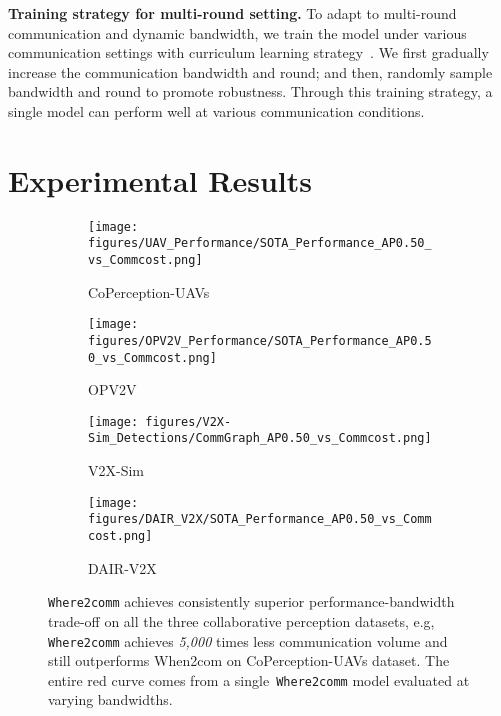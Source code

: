 \documentclass{article}
\begin{document}
\textbf{Training strategy for multi-round setting.} To adapt to multi-round communication and dynamic bandwidth, we train the model under various communication settings with curriculum learning strategy~\cite{curriculum}. We first gradually increase the communication bandwidth and round; and then, randomly sample bandwidth and round to promote robustness. Through this training strategy, a single model can perform well at various communication conditions.
%
 \vspace{-2mm}
\section{Experimental Results}
\vspace{-2mm}


\begin{figure}[!t]
  \centering
\begin{subfigure}{0.49\linewidth}
    \texttt{[image: figures/UAV\_Performance/SOTA\_Performance\_AP0.50\_vs\_Commcost.png]}
    \caption{CoPerception-UAVs}
    \label{fig:UAV_SOTA}
  \end{subfigure}
\begin{subfigure}{0.49\linewidth}
    \texttt{[image: figures/OPV2V\_Performance/SOTA\_Performance\_AP0.50\_vs\_Commcost.png]}
    \caption{OPV2V}
    \label{fig:OPV2V_SOTA}
  \end{subfigure}
\begin{subfigure}{0.49\linewidth}
    \texttt{[image: figures/V2X-Sim\_Detections/CommGraph\_AP0.50\_vs\_Commcost.png]}
    \caption{V2X-Sim}
    \label{fig:V2X_SOTA}
    \end{subfigure}
\begin{subfigure}{0.49\linewidth}
    \texttt{[image: figures/DAIR\_V2X/SOTA\_Performance\_AP0.50\_vs\_Commcost.png]}
    \caption{DAIR-V2X}
    \label{fig:DAIR_SOTA}
    \end{subfigure}
  \vspace{-1mm}
  \caption{\texttt{Where2comm} achieves consistently superior performance-bandwidth trade-off on all the three collaborative perception datasets, e.g, \texttt{Where2comm} achieves \emph{5,000} times less communication volume and still outperforms When2com on CoPerception-UAVs dataset. The entire red curve comes from a single~\texttt{Where2comm} model evaluated at varying bandwidths.}
  \label{fig:SOTA}
  \vspace{-3mm}
\end{figure}
\end{document}
